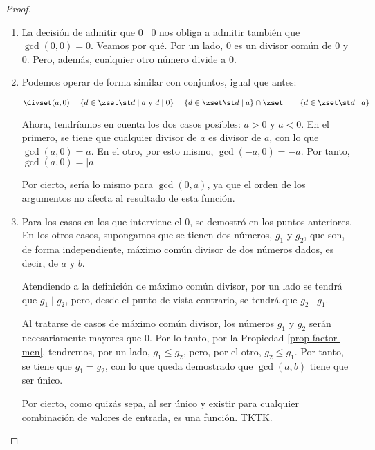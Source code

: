 \begin{proof}
  -
  \begin{enumerate}
    \item La decisión de admitir que $0 \mid 0$ nos obliga a admitir también
      que $\gcd(0, 0) = 0$. Veamos por qué. Por un lado, 0 es un divisor
      común de 0 y 0. Pero, además, cualquier otro número divide a 0.

      \iffalse
      Alternativamente, se puede razonar como que 0 es el único múltiplo de
      0.
      \fi

    \item Podemos operar de forma similar con conjuntos, igual que antes:

      \[ \divset(a, 0) = \{d \in \zset \st d \mid a \ \text{y} \ d \mid 0\}
      = \{d \in \zset \st d \mid a\} \cap \zset = = \{d \in \zset \st d \mid
      a\} \]

      Ahora, tendríamos en cuenta los dos casos posibles: $a > 0$ y $a < 0$.
      En el primero, se tiene que cualquier divisor de $a$ es divisor de
      $a$, con lo que $\gcd(a, 0) = a$. En el otro, por esto mismo,
      $\gcd({-a}, 0) = {-a}$. Por tanto, $\gcd(a, 0) = |a|$

      Por cierto, sería lo mismo para $\gcd(0, a)$, ya que el orden de los
      argumentos no afecta al resultado de esta función.

    \item Para los casos en los que interviene el 0, se demostró en los
      puntos anteriores. En los otros casos, supongamos que se tienen dos
      números, $g_1$ y $g_2$, que son, de forma independiente, máximo común
      divisor de dos números dados, es decir, de $a$ y $b$.

      Atendiendo a la definición de máximo común divisor, por un lado se
      tendrá que $g_1 \mid g_2$, pero, desde el punto de vista contrario, se
      tendrá que $g_2 \mid g_1$.

      Al tratarse de casos de máximo común divisor, los números $g_1$ y
      $g_2$ serán necesariamente mayores que 0. Por lo tanto, por la
      Propiedad \ref{prop-factor-men}, tendremos, por un lado, $g_1 \leq
      g_2$, pero, por el otro, $g_2 \leq g_1$. Por tanto, se tiene que $g_1
      = g_2$, con lo que queda demostrado que $\gcd(a, b)$ tiene que ser
      único.

      Por cierto, como quizás sepa, al ser único y existir para cualquier
      combinación de valores de entrada, es una función. TKTK.


\end{enumerate}
\end{proof}
